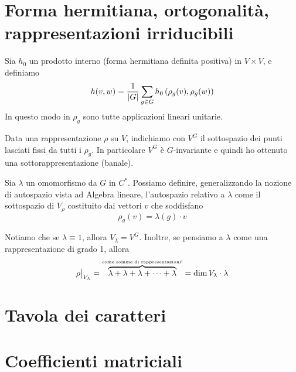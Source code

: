 \documentclass[a4paper,10pt,oneside]{math_article}
\begin{document}
  \section{Forma hermitiana, ortogonalità, rappresentazioni irriducibili}
    Sia $h_0$ un prodotto interno (forma hermitiana definita positiva) in $V\times V$, e definiamo 
    \[
      h(v,w)=\frac1{\left|G\right|}\sum_{g\in G}h_0\left(\rho_g(v),\rho_g(w)\right) 
    \]
    In questo modo in $\rho_g$ sono tutte applicazioni lineari unitarie.
    
    \begin{myexample}
     Data una rappresentazione $\rho$ su $V$, indichiamo con $V^G$ il sottospazio dei punti lasciati fissi da tutti i $\rho_g$. In particolare $V^G$ è $G$-invariante e quindi ho ottenuto una sottorappresentazione (banale). 
    \end{myexample}
    \begin{myexample}
     Sia $\lambda$ un omomorfismo da $G$ in $C^*$. Possiamo definire, generalizzando la nozione di autospazio vista ad Algebra lineare, l'autospazio relativo a $\lambda$ come il sottospazio di $V_\rho$ costituito dai vettori $v$ che soddisfano 
     \[
      \rho_g(v)=\lambda(g)\cdot v
     \]

     Notiamo che se $\lambda \equiv 1$, allora $V_\lambda=V^G$. Inoltre, se pensiamo a $\lambda$ come una rappresentazione di grado 1, allora 
     \[	
      \restr\rho{V_\lambda}= \overbrace{\lambda + \lambda + \lambda + \dots + \lambda}^{\mbox{\tiny come somme di rappresentazioni!}}=\dim V_\lambda \cdot \lambda
     \]     
    \end{myexample}
\fi

 
  \section{Tavola dei caratteri}
 
  \section{Coefficienti matriciali}
 
 
 
\end{document}
